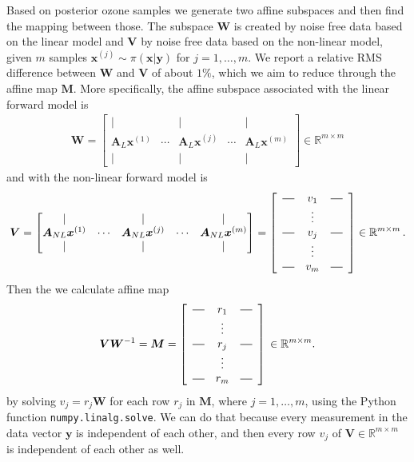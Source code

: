 Based on posterior ozone samples we generate two affine subspaces and then find the mapping between those.
The subspace $\bm{W}$ is created by noise free data based on the linear model and $\bm{V}$ by noise free data based on the non-linear model, given $m$ samples $\bm{x}^{(j)} \sim \pi(\bm{x}|\bm{y})$ for $j = 1, \dots,m$.
We report a relative RMS difference between $\bm{W}$ and $\bm{V}$ of about $1\%$, which we aim to reduce through the affine map $\bm{M}$.
More specifically, the affine subspace associated with the linear forward model is 
\begin{align}
	\bm{W} = \begin{bmatrix}
		\vert&   &  \vert & & \vert \\
		\bm{A}_{L} \bm{x}^{(1)} &  \cdots& \bm{A}_{L} \bm{x}^{(j)} &  \cdots & \bm{A}_{L} \bm{x}^{(m)} \\
		\vert&   &  \vert & & \vert 
	\end{bmatrix}
	\in \mathbb{R}^{m \times m}
\end{align} and with the non-linear forward model is 
\begin{align}
	\bm{V} = \begin{bmatrix}
		\vert&   &  \vert & & \vert \\
		\bm{A}_{NL}\bm{x}^{(1)} &  \cdots& \bm{A}_{NL}\bm{x}^{(j)} &  \cdots & \bm{A}_{NL} \bm{x}^{(m)}  \\
		\vert&   &  \vert & & \vert 
	\end{bmatrix} = 
	\begin{bmatrix}
		\begin{array}{ccc}
			\horzbar & v_{1} & \horzbar \\
			& \vdots    &          \\
			\horzbar & v_{j} & \horzbar \\
			& \vdots    &          \\
			\horzbar &v_{m} & \horzbar
		\end{array}
	\end{bmatrix}\in \mathbb{R}^{m \times m} \, .
\end{align}
Then the we calculate affine map 
\begin{align}
	\bm{V}\bm{W}^{-1} = \bm{M} =
	\begin{bmatrix}
		\begin{array}{ccc}
			\horzbar & r_{1} & \horzbar \\
			& \vdots    &          \\
			\horzbar & r_{j} & \horzbar \\
			& \vdots    &          \\
			\horzbar &r_{m} & \horzbar
		\end{array}
	\end{bmatrix}\, \in \mathbb{R}^{m \times m} .
\end{align}
by solving $v_j =r_j \bm{W}$ for each row $r_j$ in $\bm{M}$, where $j = 1, \dots, m$, using the Python function \texttt{numpy.linalg.solve}.
We can do that because every measurement in the data vector $\bm{y}$ is independent of each other, and then every row $v_j$ of $\bm{V} \in \mathbb{R}^{m \times m}$ is independent of each other as well.

